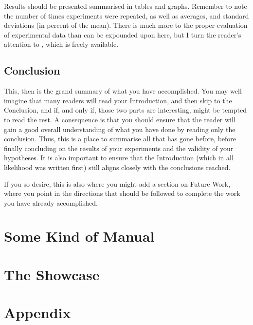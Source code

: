 \documentclass[ twoside,openright,titlepage,numbers=noenddot,headinclude,%
                footinclude=true,cleardoublepage=empty,abstractoff, %
                BCOR=5mm,paper=a4,fontsize=11pt,%
                ngerman,american,%
                ]{scrreprt}
\begin{document}
Results should be presented summarised in tables and graphs.  Remember
to note the number of times experiments were repeated, as well as
averages, and standard deviations (in percent of the mean).  There is
much more to the proper evaluation of experimental data than can be
expounded upon here, but I turn the reader's attention to
\citep{Downey2011:TSPASFP2011}, which is freely available.


\chapter{Conclusion}
\label{cha:conclusion}

This, then is the grand summary of what you have accomplished.  You
may well imagine that many readers will read your Introduction, and
then skip to the Conclusion, and if, and only if, those two parts are
interesting, might be tempted to read the rest. A consequence is that
you should ensure that the reader will gain a good overall
understanding of what you have done by reading only the conclusion.
Thus, this is a place to summarise all that has gone before, before
finally concluding on the results of your experiments and the validity
of your hypotheses. It is also important to ensure that the
Introduction (which in all likelihood was written first) still aligns
closely with the conclusions reached.

If you so desire, this is also where you might add a section on Future
Work, where you point in the directions that should be followed to
complete the work you have already accomplished.



\part{Some Kind of Manual}
\label{part:manual}

\cleardoublepage

\part{The Showcase}





\appendix
\cleardoublepage
\part{Appendix}

\cleardoublepage
\cleardoublepage
\cleardoublepage
\end{document}
